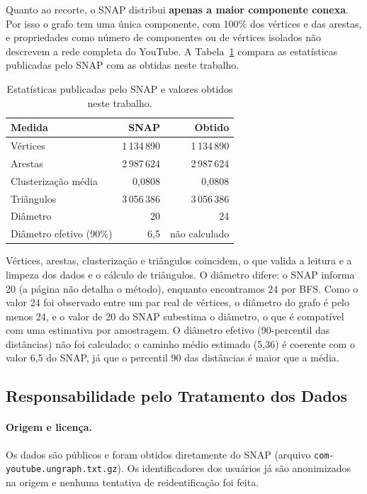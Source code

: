 \documentclass[sigconf]{webmedia}
\begin{document}
Quanto ao recorte, o SNAP distribui \textbf{apenas a maior componente conexa}. Por isso o grafo tem uma única componente, com 100\% dos vértices e das arestas, e propriedades como número de componentes ou de vértices isolados não descrevem a rede completa do YouTube. A Tabela~\ref{tab:snap} compara as estatísticas publicadas pelo SNAP com as obtidas neste trabalho.

\begin{table}
  \caption{Estatísticas publicadas pelo SNAP e valores obtidos neste trabalho.}
  \label{tab:snap}
  \small
  \begin{tabular}{lrr}
    \toprule
    Medida & SNAP & Obtido \\
    \midrule
    Vértices & 1\,134\,890 & 1\,134\,890 \\
    Arestas & 2\,987\,624 & 2\,987\,624 \\
    Clusterização média & 0,0808 & 0,0808 \\
    Triângulos & 3\,056\,386 & 3\,056\,386 \\
    Diâmetro & 20 & 24 \\
    Diâmetro efetivo (90\%) & 6,5 & não calculado \\
    \bottomrule
  \end{tabular}
\end{table}

Vértices, arestas, clusterização e triângulos coincidem, o que valida a leitura e a limpeza dos dados e o cálculo de triângulos. O diâmetro difere: o SNAP informa 20 (a página não detalha o método), enquanto encontramos 24 por BFS. Como o valor 24 foi observado entre um par real de vértices, o diâmetro do grafo é pelo menos 24, e o valor de 20 do SNAP subestima o diâmetro, o que é compatível com uma estimativa por amostragem. O diâmetro efetivo (90-percentil das distâncias) não foi calculado; o caminho médio estimado (5,36) é coerente com o valor 6,5 do SNAP, já que o percentil 90 das distâncias é maior que a média.

\subsection{Responsabilidade pelo Tratamento dos Dados}
\label{sec:dados}
\paragraph{Origem e licença.} Os dados são públicos e foram obtidos diretamente do SNAP (arquivo \texttt{com-youtube.ungraph.txt.gz}). Os identificadores dos usuários já são anonimizados na origem e nenhuma tentativa de reidentificação foi feita.
\end{document}
